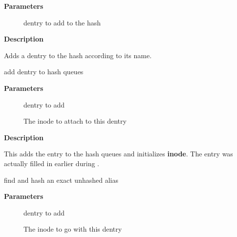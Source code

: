 \documentclass[a4paper,8pt,english]{sphinxmanual}
\begin{document}
\textbf{Parameters}
\begin{description}
\item[{}] \leavevmode
dentry to add to the hash

\end{description}

\textbf{Description}

Adds a dentry to the hash according to its name.

\begin{fulllineitems}
\label{filesystems/index:c.d_add}
add dentry to hash queues

\end{fulllineitems}


\textbf{Parameters}
\begin{description}
\item[{}] \leavevmode
dentry to add

\item[{}] \leavevmode
The inode to attach to this dentry

\end{description}

\textbf{Description}

This adds the entry to the hash queues and initializes \textbf{inode}.
The entry was actually filled in earlier during {\hyperref[filesystems/index:c.d_alloc]{\emph{}}}.

\begin{fulllineitems}
\label{filesystems/index:c.d_exact_alias}
find and hash an exact unhashed alias

\end{fulllineitems}


\textbf{Parameters}
\begin{description}
\item[{}] \leavevmode
dentry to add

\item[{}] \leavevmode
The inode to go with this dentry

\end{description}
\end{document}
